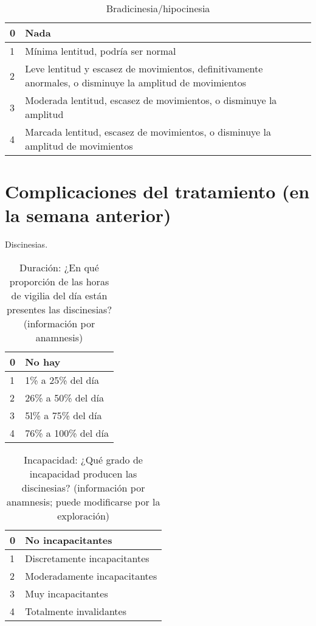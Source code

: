 \begin{table}[H]
\begin{center}
\begin{tabular}{|p{1cm}|p{11cm}|}
\hline
0 & Nada \\\hline
1 & Mínima lentitud, podría ser normal \\\hline
2 & Leve lentitud y escasez de movimientos, definitivamente anormales, o disminuye la amplitud de movimientos\\\hline
3 & Moderada lentitud, escasez de movimientos, o disminuye la amplitud\\\hline
4 & Marcada lentitud, escasez de movimientos, o disminuye la amplitud de movimientos\\\hline
\end{tabular}
\caption{Bradicinesia/hipocinesia}
\end{center}
\end{table}

\section{Complicaciones del tratamiento (en la semana anterior)}
Discinesias.
\begin{table}[H]
\begin{center}
\begin{tabular}{|p{1cm}|p{11cm}|}
\hline
0 & No hay \\\hline
1 & 1\% a 25\% del día \\\hline
2 & 26\% a 50\% del día\\\hline
3 & 5l\% a 75\% del día \\\hline
4 & 76\% a 100\% del día\\\hline
\end{tabular}
\caption{Duración: ¿En qué proporción de las horas de vigilia del día están presentes las discinesias? (información por anamnesis)}
\end{center}
\end{table}

\begin{table}[H]
\begin{center}
\begin{tabular}{|p{1cm}|p{11cm}|}
\hline
0 & No incapacitantes \\\hline
1 & Discretamente incapacitantes \\\hline
2 & Moderadamente incapacitantes\\\hline
3 & Muy incapacitantes \\\hline
4 & Totalmente invalidantes\\\hline
\end{tabular}
\caption{Incapacidad: ¿Qué grado de incapacidad producen las discinesias? (información por anamnesis; puede modificarse por la exploración)}
\end{center}
\end{table}

